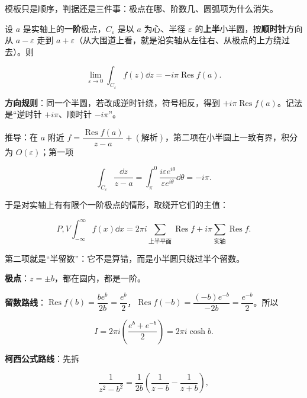 \documentclass[11pt]{ctexart}
\renewcommand{\qbreak}{\needspace{0.45\textheight}}
\let\origsubhdr\subhdr
\renewcommand{\subhdr}[1]{\par\needspace{4\baselineskip}\origsubhdr{#1}}
\let\orighdr\hdr
\renewcommand{\hdr}[2]{\par\orighdr{#1}{#2}}
\begin{document}
模板只是顺序，判据还是三件事：极点在哪、阶数几、圆弧项为什么消失。



设 $a$ 是实轴上的\textbf{一阶}极点，$C_\varepsilon$ 是以 $a$ 为心、半径 $\varepsilon$ 的\textbf{上半}小半圆，按\textbf{顺时针}方向从 $a-\varepsilon$ 走到 $a+\varepsilon$（从大围道上看，就是沿实轴从左往右、从极点的上方绕过去）。则

\[ \lim_{\varepsilon\to0}\int_{C_\varepsilon}f(z)\dd z=-i\pi\operatorname{Res}f(a) . \]

\textbf{方向规则}：同一个半圆，若改成逆时针绕，符号相反，得到 $+i\pi\operatorname{Res}f(a)$。记法是“逆时针 $+i\pi$、顺时针 $-i\pi$”。

推导：在 $a$ 附近 $f=\dfrac{\operatorname{Res}f(a)}{z-a}+(\text{解析})$，第二项在小半圆上一致有界，积分为 $O(\varepsilon)$；第一项

\[ \int_{C_\varepsilon}\frac{\dd z}{z-a}=\int_{\pi}^{0}\frac{i\varepsilon e^{i\theta}}{\varepsilon e^{i\theta}}\dd\theta=-i\pi . \]


于是对实轴上有有限个一阶极点的情形，取绕开它们的主值：

\[ P,V\!\int_{-\infty}^{\infty}f(x)\dd x=2\pi i\sum_{\text{上半平面}}\operatorname{Res}f+i\pi\sum_{\text{实轴}}\operatorname{Res}f . \]

第二项就是“半留数”：它不是算错，而是小半圆只绕过半个留数。



\qbreak
{}

\textbf{极点}：$z=\pm b$，都在圆内，都是一阶。

\textbf{留数路线}：$\operatorname{Res}f(b)=\dfrac{be^{b}}{2b}=\dfrac{e^{b}}{2}$，$\operatorname{Res}f(-b)=\dfrac{(-b)e^{-b}}{-2b}=\dfrac{e^{-b}}{2}$。所以

\[ I=2\pi i\left(\frac{e^{b}+e^{-b}}{2}\right)=2\pi i\cosh b . \]

\textbf{柯西公式路线}：先拆

\[ \frac{1}{z^{2}-b^{2}}=\frac{1}{2b}\left(\frac{1}{z-b}-\frac{1}{z+b}\right) , \]
\end{document}
